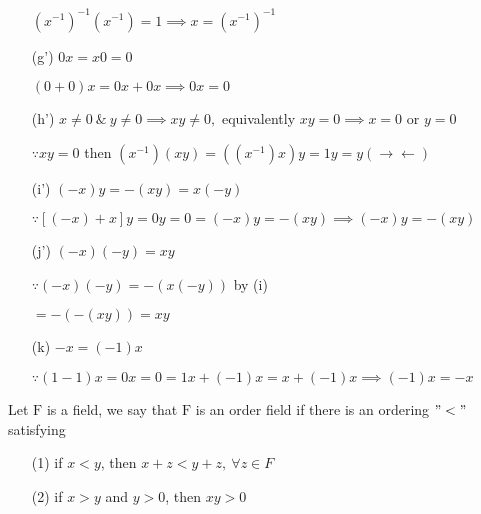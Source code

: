 \begin{enumerate}
	$(x^{-1})^{-1}(x^{-1}) = 1 \implies x = (x^{-1})^{-1}$
	
	\item[(g')]$0x = x0 = 0$
	
	$(0+0)x = 0x+0x \implies 0x = 0$
	
	\item[(h')] $x \neq 0 ~\&~ y\neq 0 \implies xy \neq 0,$ equivalently $xy =0 \implies x=0$ or $y = 0$
	
	$\because xy = 0$ then $(x^{-1})(xy) = ((x^{-1})x)y=1y=y (\rightarrow\leftarrow)$
	
	\item[(i')] $(-x)y = -(xy) = x(-y)$
	
	$\because [(-x)+x]y = 0y = 0 = (-x)y = -(xy) \implies (-x)y = -(xy)$
	
	\item[(j')] $(-x)(-y) = xy$
	
	$\because(-x)(-y) = -(x(-y))$ by (i)
	
	$= -(-(xy)) = xy$\\
	\item[(k)] $-x = (-1)x$
	
	$\because (1-1)x = 0x = 0 = 1x + (-1)x = x + (-1)x \implies (-1)x = -x$
\end{enumerate}


\begin{defn}
	Let $\mathrm{F}$ is a field, we say that $\mathrm{F}$ is an order field if there is an ordering $"<"$ satisfying
	
	\begin{enumerate}
		\item[(1)] if $x<y$, then $x+z < y+z ,~\forall z \in F$
		\item[(2)] if $x>y$ and $y>0$, then $xy >0$ 
	\end{enumerate}
\end{defn}

